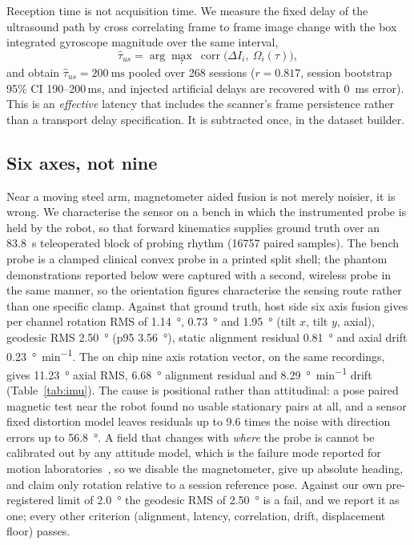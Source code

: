 \documentclass[conference]{IEEEtran}
\begin{document}
Reception time is not acquisition time. We measure the fixed delay of the
ultrasound path by cross correlating frame to frame image change with the box
integrated gyroscope magnitude over the same interval,
\begin{equation}
\hat\tau_{us} = \arg\max_{\tau}\ \operatorname{corr}\!\big(\Delta I_i,\ \Omega_i(\tau)\big),
\end{equation}
and obtain $\hat\tau_{us} = \SI{200}{\milli\second}$ pooled over 268 sessions
($r = \num{0.817}$, session bootstrap 95\% CI
\numrange{190}{200}\,\si{\milli\second}, and injected artificial delays are
recovered with \SI{0}{\milli\second} error). This is an \emph{effective} latency
that includes the scanner's frame persistence rather than a transport delay
specification. It is subtracted once, in the dataset builder.

\subsection{Six axes, not nine}

Near a moving steel arm, magnetometer aided fusion is not merely noisier, it is
wrong. We characterise the sensor on a bench in which the instrumented probe is
held by the robot, so that forward kinematics supplies ground truth over an
\SI{83.8}{\second} teleoperated block of probing rhythm (\num{16757} paired
samples). The bench probe is a clamped clinical convex probe in a printed split
shell; the phantom demonstrations reported below were captured with a second,
wireless probe in the same manner, so the orientation figures characterise the
sensing route rather than one specific clamp. Against that ground truth, host
side six axis fusion gives per channel rotation RMS of \SI{1.14}{\degree}, \SI{0.73}{\degree}
and \SI{1.95}{\degree} (tilt $x$, tilt $y$, axial), geodesic RMS
\SI{2.50}{\degree} (p95 \SI{3.56}{\degree}), static alignment residual
\SI{0.81}{\degree} and axial drift \SI{0.23}{\degree\per\minute}. The on chip
nine axis rotation vector, on the same recordings, gives \SI{11.23}{\degree}
axial RMS, \SI{6.68}{\degree} alignment residual and
\SI{8.29}{\degree\per\minute} drift (Table~\ref{tab:imu}). The cause is
positional rather than attitudinal: a pose paired magnetic test near the robot
found no usable stationary pairs at all, and a sensor fixed distortion model
leaves residuals up to \num{9.6} times the noise with direction errors up to
\SI{56.8}{\degree}. A field that changes with \emph{where} the probe is cannot
be calibrated out by any attitude model, which is the failure mode reported for
motion laboratories~\cite{devries2009magnetic,sabatini2011estimating}, so we
disable the magnetometer, give up
absolute heading, and claim only rotation relative to a session reference pose.
Against our own pre-registered limit of \SI{2.0}{\degree} the geodesic RMS of
\SI{2.50}{\degree} is a fail, and we report it as one; every other criterion
(alignment, latency, correlation, drift, displacement floor) passes.
\end{document}
